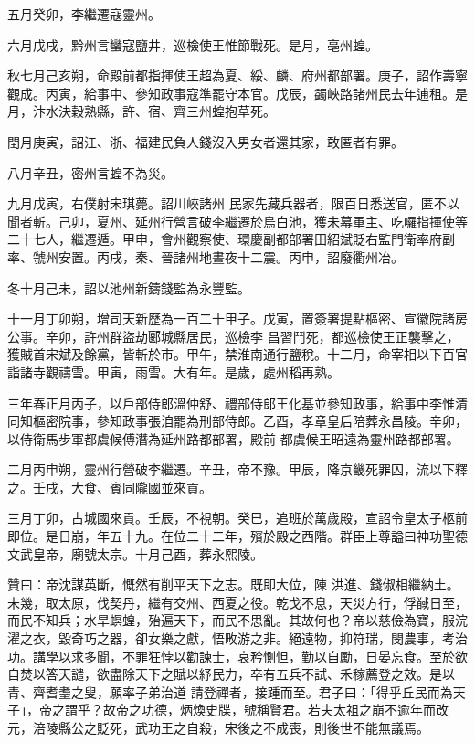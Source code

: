\begin{pinyinscope}
 五月癸卯，李繼遷寇靈州。



 六月戊戌，黔州言蠻寇鹽井，巡檢使王惟節戰死。是月，亳州蝗。



 秋七月己亥朔，命殿前都指揮使王超為夏、綏、麟、府州都部署。庚子，詔作壽寧觀成。丙寅，給事中、參知政事寇準罷守本官。戊辰，蠲峽路諸州民去年逋租。是月，汴水決穀熟縣，許、宿、齊三州蝗抱草死。



 閏月庚寅，詔江、浙、福建民負人錢沒入男女者還其家，敢匿者有罪。



 八月辛丑，密州言蝗不為災。



 九月戊寅，右僕射宋琪薨。詔川峽諸州
 民家先藏兵器者，限百日悉送官，匿不以聞者斬。己卯，夏州、延州行營言破李繼遷於烏白池，獲未幕軍主、吃囉指揮使等二十七人，繼遷遁。甲申，會州觀察使、環慶副都部署田紹斌貶右監門衛率府副率、虢州安置。丙戌，秦、晉諸州地晝夜十二震。丙申，詔廢衢州冶。



 冬十月己未，詔以池州新鑄錢監為永豐監。



 十一月丁卯朔，增司天新歷為一百二十甲子。戊寅，置簽署提點樞密、宣徽院諸房公事。辛卯，許州群盜劫郾城縣居民，巡檢李
 昌習鬥死，都巡檢使王正襲擊之，獲賊首宋斌及餘黨，皆斬於市。甲午，禁淮南通行鹽稅。十二月，命宰相以下百官詣諸寺觀禱雪。甲寅，雨雪。大有年。是歲，處州稻再熟。



 三年春正月丙子，以戶部侍郎溫仲舒、禮部侍郎王化基並參知政事，給事中李惟清同知樞密院事，參知政事張洎罷為刑部侍郎。乙酉，孝章皇后陪葬永昌陵。辛卯，以侍衛馬步軍都虞候傅潛為延州路都部署，殿前
 都虞候王昭遠為靈州路都部署。



 二月丙申朔，靈州行營破李繼遷。辛丑，帝不豫。甲辰，降京畿死罪囚，流以下釋之。壬戌，大食、賓同隴國並來貢。



 三月丁卯，占城國來貢。壬辰，不視朝。癸巳，追班於萬歲殿，宣詔令皇太子柩前即位。是日崩，年五十九。在位二十二年，殯於殿之西階。群臣上尊謚曰神功聖德文武皇帝，廟號太宗。十月己酉，葬永熙陵。



 贊曰：帝沈謀英斷，慨然有削平天下之志。既即大位，陳
 洪進、錢俶相繼納土。未幾，取太原，伐契丹，繼有交州、西夏之役。乾戈不息，天災方行，俘馘日至，而民不知兵；水旱螟蝗，殆遍天下，而民不思亂。其故何也？帝以慈儉為寶，服浣濯之衣，毀奇巧之器，卻女樂之獻，悟畋游之非。絕遠物，抑符瑞，閔農事，考治功。講學以求多聞，不罪狂悖以勸諫士，哀矜惻怛，勤以自勵，日晏忘食。至於欲自焚以答天譴，欲盡除天下之賦以紓民力，卒有五兵不試、禾稼薦登之效。是以青、齊耆耋之叟，願率子弟治道
 請登禪者，接踵而至。君子曰：「得乎丘民而為天子」，帝之謂乎？故帝之功德，炳煥史牒，號稱賢君。若夫太祖之崩不逾年而改元，涪陵縣公之貶死，武功王之自殺，宋後之不成喪，則後世不能無議焉。



\end{pinyinscope}